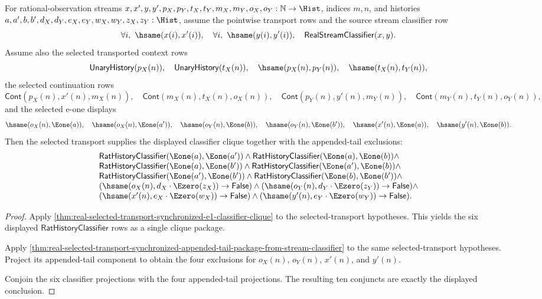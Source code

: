 \begin{theorem}
\label{thm:real-selected-transport-synchronized-appended-tail-classifier-clique}
For rational-observation streams
$x,x',y,y',p_X,p_Y,t_X,t_Y,m_X,m_Y,o_X,o_Y:\mathbb{N}\to\Hist$,
indices $m,n$, and histories
$a,a',b,b',d_X,d_Y,e_X,e_Y,w_X,w_Y,z_X,z_Y:\Hist$, assume the pointwise
transport rows and the source stream classifier row
$$
\forall i,\ \hsame(x(i),x'(i)),\quad
\forall i,\ \hsame(y(i),y'(i)),\quad
\mathsf{RealStreamClassifier}(x,y).
$$
Assume also the selected transported context rows
$$
\mathsf{UnaryHistory}(p_X(n)),\quad
\mathsf{UnaryHistory}(t_X(n)),\quad
\hsame(p_X(n),p_Y(n)),\quad
\hsame(t_X(n),t_Y(n)),
$$
the selected continuation rows
$$
\mathsf{Cont}(p_X(n),x'(n),m_X(n)),\quad
\mathsf{Cont}(m_X(n),t_X(n),o_X(n)),
\quad\mathsf{Cont}(p_Y(n),y'(n),m_Y(n)),\quad
\mathsf{Cont}(m_Y(n),t_Y(n),o_Y(n)),
$$
and the selected e-one displays
$$
\hsame(o_X(n),\Eone(a)),\quad
\hsame(o_X(n),\Eone(a')),\quad
\hsame(o_Y(n),\Eone(b)),\quad
\hsame(o_Y(n),\Eone(b')),\quad
\hsame(x'(n),\Eone(a)),\quad
\hsame(y'(n),\Eone(b)).
$$
Then the selected transport supplies the displayed classifier clique together
with the appended-tail exclusions:
$$
\begin{array}{l}
\mathsf{RatHistoryClassifier}(\Eone(a),\Eone(a'))\land
\mathsf{RatHistoryClassifier}(\Eone(a),\Eone(b))\land\\
\mathsf{RatHistoryClassifier}(\Eone(a),\Eone(b'))\land
\mathsf{RatHistoryClassifier}(\Eone(a'),\Eone(b))\land\\
\mathsf{RatHistoryClassifier}(\Eone(a'),\Eone(b'))\land
\mathsf{RatHistoryClassifier}(\Eone(b),\Eone(b'))\land\\
(\hsame(o_X(n),d_X\cdot\Ezero(z_X))\to\mathsf{False})\land
(\hsame(o_Y(n),d_Y\cdot\Ezero(z_Y))\to\mathsf{False})\land\\
(\hsame(x'(n),e_X\cdot\Ezero(w_X))\to\mathsf{False})\land
(\hsame(y'(n),e_Y\cdot\Ezero(w_Y))\to\mathsf{False}).
\end{array}
$$
\end{theorem}
\begin{proof}
Apply
\autoref{thm:real-selected-transport-synchronized-e1-classifier-clique}
to the selected-transport hypotheses. This yields the six displayed
$\mathsf{RatHistoryClassifier}$ rows as a single clique package.

Apply
\autoref{thm:real-selected-transport-synchronized-appended-tail-package-from-stream-classifier}
to the same selected-transport hypotheses. Project its appended-tail component
to obtain the four exclusions for $o_X(n)$, $o_Y(n)$, $x'(n)$, and $y'(n)$.

Conjoin the six classifier projections with the four appended-tail projections.
The resulting ten conjuncts are exactly the displayed conclusion.
\end{proof}

